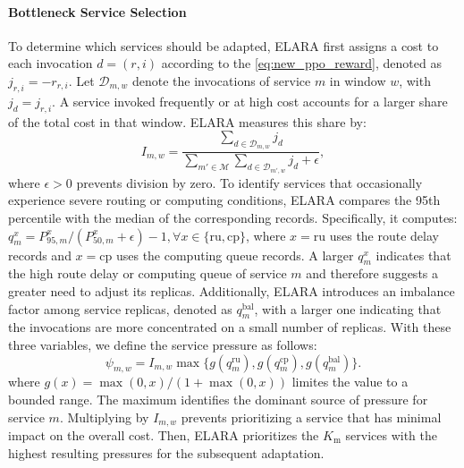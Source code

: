 \documentclass[10pt, conference, letterpaper]{IEEEtran}
\begin{document}
\paragraph{Bottleneck Service Selection}
To determine which services should be adapted, ELARA first assigns a cost to each invocation $d=(r,i)$ according to the \eqref{eq:new_ppo_reward}, denoted as  $j_{r,i} = -r_{r,i}$.
Let $\mathcal D_{m,w}$ denote the invocations of service $m$ in window $w$, with $j_d=j_{r,i}$. A service invoked frequently or at high cost accounts for a larger share of the total cost in that window. ELARA measures this share by:
\begin{equation}
I_{m,w}=\frac{\sum_{d\in\mathcal D_{m,w}}j_d}
{\sum_{m'\in\mathcal M}\sum_{d\in\mathcal D_{m',w}}j_d+\epsilon},
\label{eq:new_service_impact}
\end{equation}
where $\epsilon > 0$ prevents division by zero. 
To identify services that occasionally experience severe routing or computing conditions, ELARA compares the 95th percentile with the median of the corresponding records. Specifically, it computes: $q_m^x=P_{95,m}^x/(P_{50,m}^x+\epsilon)-1, \forall x \in  \{ \text{ru}, \text{cp} \}$, where $x=\text{ru}$ uses the route delay records and $x=\text{cp}$ uses the computing queue records. A larger $q_m^x$ indicates that the high route delay or computing queue of service $m$ and therefore suggests a greater need to adjust its replicas. 
Additionally, ELARA introduces an imbalance factor among service replicas, denoted as $q_m^{\text{bal}}$, with a larger one indicating that the invocations are more concentrated on a small number of replicas. 
With these three variables, we define the service pressure as follows:
\begin{equation}
\psi_{m,w}=I_{m,w}\max\{g(q_m^{\text{ru}}),
g(q_m^{\text{cp}}),g(q_m^{\text{bal}})\}.
\label{eq:new_service_pressure}
\end{equation}
where $g(x)=\max(0,x)/(1+\max(0,x))$ limites the value to a bounded range.
The maximum identifies the dominant source of pressure for service $m$. Multiplying by $I_{m,w}$ prevents prioritizing a service that has minimal impact on the overall cost. 
Then, ELARA prioritizes the $K_{\mathrm m}$ services with the highest resulting pressures for the subsequent adaptation.
\end{document}
